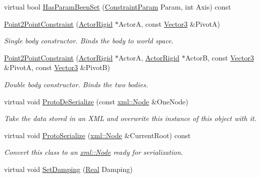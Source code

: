 \begin{DoxyCompactItemize}
virtual bool \hyperlink{classphys_1_1Point2PointConstraint_a37ba19abafb1fad5a898b22cdd792129}{HasParamBeenSet} (\hyperlink{namespacephys_aa1e7cf2d7efcaeaeac304f711e7564e8}{ConstraintParam} Param, int Axis) const 
\item 
\hyperlink{classphys_1_1Point2PointConstraint_a64806b50332492d3342884f40e7871fb}{Point2PointConstraint} (\hyperlink{classphys_1_1ActorRigid}{ActorRigid} $\ast$ActorA, const \hyperlink{classphys_1_1Vector3}{Vector3} \&PivotA)
\begin{DoxyCompactList}\small\item\em Single body constructor. Binds the body to world space. \item\end{DoxyCompactList}\item 
\hyperlink{classphys_1_1Point2PointConstraint_a890c02b69d2b477e5e7c638c36a8c84d}{Point2PointConstraint} (\hyperlink{classphys_1_1ActorRigid}{ActorRigid} $\ast$ActorA, \hyperlink{classphys_1_1ActorRigid}{ActorRigid} $\ast$ActorB, const \hyperlink{classphys_1_1Vector3}{Vector3} \&PivotA, const \hyperlink{classphys_1_1Vector3}{Vector3} \&PivotB)
\begin{DoxyCompactList}\small\item\em Double body constructor. Binds the two bodies. \item\end{DoxyCompactList}\item 
virtual void \hyperlink{classphys_1_1Point2PointConstraint_a1ba1bd6cc8d16c69579633f0a5b28b6d}{ProtoDeSerialize} (const \hyperlink{classphys_1_1xml_1_1Node}{xml::Node} \&OneNode)
\begin{DoxyCompactList}\small\item\em Take the data stored in an XML and overwrite this instance of this object with it. \item\end{DoxyCompactList}\item 
virtual void \hyperlink{classphys_1_1Point2PointConstraint_ace2e182da3c1495084eea1a5fcc97cfd}{ProtoSerialize} (\hyperlink{classphys_1_1xml_1_1Node}{xml::Node} \&CurrentRoot) const 
\begin{DoxyCompactList}\small\item\em Convert this class to an \hyperlink{classphys_1_1xml_1_1Node}{xml::Node} ready for serialization. \item\end{DoxyCompactList}\item 
virtual void \hyperlink{classphys_1_1Point2PointConstraint_a4699d58e8ec97e5eafa12508e89fa878}{SetDamping} (\hyperlink{namespacephys_af7eb897198d265b8e868f45240230d5f}{Real} Damping)

\end{DoxyCompactItemize}
